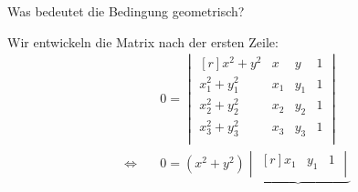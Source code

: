 \documentclass[answers]{exam}
\newcommand{\dvektor}[1]{\begin{vmatrix*}[r] #1 \end{vmatrix*}}
\begin{document}
\begin{questions}
    Was bedeutet die Bedingung geometrisch?
    \begin{solution}
        Wir entwickeln die Matrix nach der ersten Zeile:
        $$
            \begin{aligned}
                                                   & 0                                                                                                                                                                                                                      =
                \dvektor{
                x^2 + y^2                          & x                                                                                                                                                                                                                                                                                              & y   & 1 \\
                x_1^2 + y_1^2                      & x_1                                                                                                                                                                                                                                                                                            & y_1 & 1 \\
                x_2^2 + y_2^2                      & x_2                                                                                                                                                                                                                                                                                            & y_2 & 1 \\
                x_3^2 + y_3^2                      & x_3                                                                                                                                                                                                                                                                                            & y_3 & 1 \\
                }
                \\
                \iff \quad                         & 0                                                                                                                                                                                                                      =
                \left(x^2 + y^2\right)
                \underbrace{
                    \dvektor{
                x_1                                & y_1                                                                                                                                                                                                                                                                                            & 1       \\
}}
\end{aligned}$$
\end{solution}
\end{questions}
\end{document}
